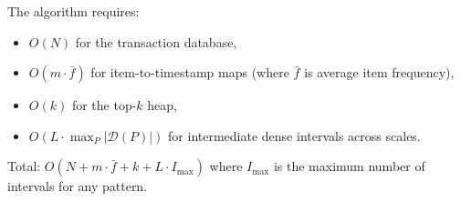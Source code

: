 \begin{theorem}\label{thm:space}
The algorithm requires:
\begin{itemize}
\item $O(N)$ for the transaction database,
\item $O(m \cdot \bar{f})$ for item-to-timestamp maps
  (where $\bar{f}$ is average item frequency),
\item $O(k)$ for the top-$k$ heap,
\item $O(L \cdot \max_P |\mathcal{D}(P)|)$ for intermediate
  dense intervals across scales.
\end{itemize}
Total: $O(N + m \cdot \bar{f} + k + L \cdot I_{\max})$
where $I_{\max}$ is the maximum number of intervals for any pattern.
\end{theorem}
